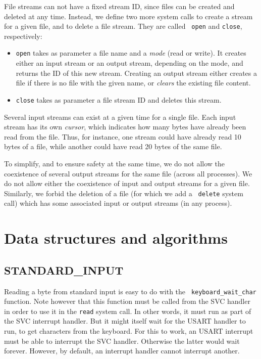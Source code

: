 File streams can not have a fixed stream ID, since files can be created and
deleted at any time. Instead, we define two more system calls to create a
stream for a given file, and to delete a file stream. They are called {\tt
open} and {\tt close}, respectively:
\begin{itemize}
  \item {\tt open} takes as parameter a file name and a {\em mode} (read or
  write). It creates either an input stream or an output stream, depending on
  the mode, and returns the ID of this new stream. Creating an output stream
  either creates a file if there is no file with the given name, or {\em
  clears} the existing file content.

  \item {\tt close} takes as parameter a file stream ID and deletes this stream.
\end{itemize}

Several input streams can exist at a given time for a single file. Each input
stream has its own {\em cursor}, which indicates how many bytes have already
been read from the file. Thus, for instance, one stream could have already read
10 bytes of a file, while another could have read 20 bytes of the same file.

To simplify, and to ensure safety at the same time, we do not allow the
coexistence of several output streams for the same file (across all processes).
We do not allow either the coexistence of input and output streams for a given
file. Similarly, we forbid the deletion of a file (for which we add a {\tt
delete} system call) which has some associated input or output streams (in any
process).

\section{Data structures and algorithms}

\subsection{STANDARD\_INPUT}

Reading a byte from standard input is easy to do with the {\tt
keyboard\_wait\_char} function. Note however that this function must be called
from the SVC handler in order to use it in the {\tt read} system call. In other
words, it must run as part of the SVC interrupt handler. But it might itself
wait for the USART handler to run, to get characters from the keyboard. For
this to work, an USART interrupt must be able to interrupt the SVC handler.
Otherwise the latter would wait forever. However, by default, an interrupt
handler cannot interrupt another.

